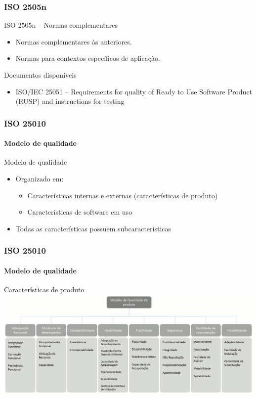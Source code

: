  \begin{frame}
	\frametitle{ISO 2505n}

	\begin{block:concept}{ISO 2505n -- Normas complementares}
		\begin{itemize}
			\item Normas complementares às anteriores.
			\item Normas para contextos específicos de aplicação.
		\end{itemize}
	\end{block:concept}
	
	\begin{block:fact}{Documentos disponíveis}
		\begin{itemize}
			\item ISO/IEC 25051 -- Requirements for quality of Ready to Use Software
			Product (RUSP) and instructions for testing
		\end{itemize} 
	\end{block:fact}
\end{frame}
 
 
\begin{frame}
	\frametitle{ISO 25010}
	\framesubtitle{Modelo de qualidade}

	\begin{block:fact}{Modelo de qualidade}
		\begin{itemize}
			\item Organizado em:
			\begin{itemize}
				\item Características internas e externas (características de produto)
				\item Características de software em uso
			\end{itemize}
			
			\item Todas as características possuem subcaracterísticas
		\end{itemize}
	\end{block:fact}
\end{frame}

\begin{frame}
	\frametitle{ISO 25010}
	\framesubtitle{Modelo de qualidade}
	
	\begin{block:fact}{Características de produto}
			\centering
			\includegraphics[width=\textwidth]{square-quality_model}
	\end{block:fact}
\end{frame}


